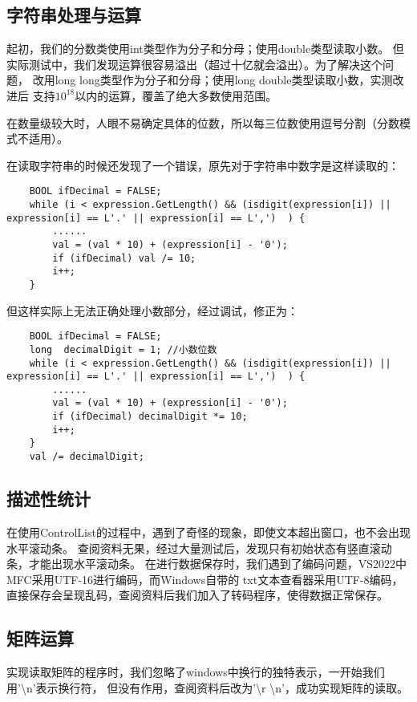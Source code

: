 \subsection{字符串处理与运算}
起初，我们的分数类使用int类型作为分子和分母；使用double类型读取小数。
但实际测试中，我们发现运算很容易溢出（超过十亿就会溢出）。为了解决这个问题，
改用long long类型作为分子和分母；使用long double类型读取小数，实测改进后
支持$10^{18}$以内的运算，覆盖了绝大多数使用范围。

在数量级较大时，人眼不易确定具体的位数，所以每三位数使用逗号分割（分数模式不适用）。

在读取字符串的时候还发现了一个错误，原先对于字符串中数字是这样读取的：
\begin{lstlisting}
    BOOL ifDecimal = FALSE;
    while (i < expression.GetLength() && (isdigit(expression[i]) || expression[i] == L'.' || expression[i] == L',')  ) {
        ......
        val = (val * 10) + (expression[i] - '0');
        if (ifDecimal) val /= 10;
        i++;
    }
\end{lstlisting}
但这样实际上无法正确处理小数部分，经过调试，修正为：
\begin{lstlisting}
    BOOL ifDecimal = FALSE;
    long  decimalDigit = 1; //小数位数
    while (i < expression.GetLength() && (isdigit(expression[i]) || expression[i] == L'.' || expression[i] == L',')  ) {
        ......
        val = (val * 10) + (expression[i] - '0');
        if (ifDecimal) decimalDigit *= 10;
        i++;
    }
    val /= decimalDigit;
\end{lstlisting}

\subsection{描述性统计}
在使用ControlList的过程中，遇到了奇怪的现象，即使文本超出窗口，也不会出现水平滚动条。
查阅资料无果，经过大量测试后，发现只有初始状态有竖直滚动条，才能出现水平滚动条。
在进行数据保存时，我们遇到了编码问题，VS2022中MFC采用UTF-16进行编码，而Windows自带的
txt文本查看器采用UTF-8编码，直接保存会呈现乱码，查阅资料后我们加入了转码程序，使得数据正常保存。


\subsection{矩阵运算}
实现读取矩阵的程序时，我们忽略了windows中换行的独特表示，一开始我们用'\textbackslash n'表示换行符，
但没有作用，查阅资料后改为'\textbackslash r \textbackslash n'，成功实现矩阵的读取。










